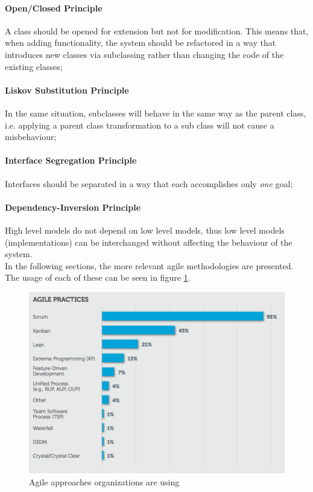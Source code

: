 \documentclass[conference]{IEEEtran}
\begin{document}
\paragraph{Open/Closed Principle} A class should be opened for extension but not for modification. This means that, when adding functionality, the system should be refactored in a way that introduces new classes via subclassing rather than changing the code of the existing classes;
\paragraph{Liskov Substitution Principle} In the same situation, subclasses will behave in the same way as the parent class, i.e. applying a parent class transformation to a sub class will not cause a misbehaviour;
\paragraph{Interface Segregation Principle}  Interfaces should be separated in a way that each accomplishes only \textit{one} goal;
\paragraph{Dependency-Inversion Principle} High level models do not depend on low level models, thus low level models (implementations) can be interchanged without affecting the behaviour of the system.\\

In the following sections, the more relevant agile methodologies are presented. The usage of each of these can be seen in figure \ref{fig:agilegraph}.

\begin{figure}%
\centering
\includegraphics[width=1.0\linewidth]{agile_graph}
\caption{Agile approaches organizations are using\protect\footnotemark \cite{ScrumAlliance:Zd-iSY9G}}
\label{fig:agilegraph}
\end{figure}
\end{document}
